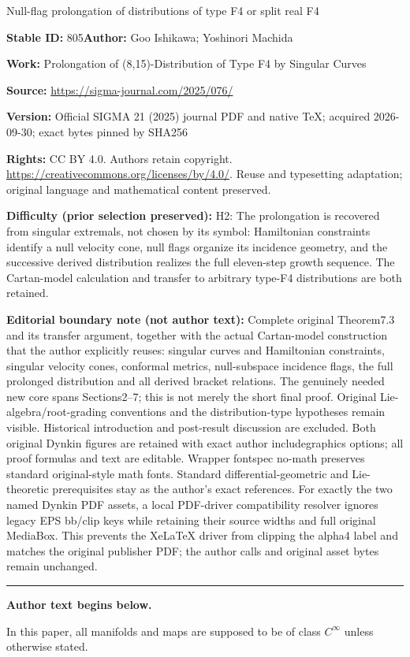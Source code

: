 \documentclass[11pt]{article}
\numberwithin{equation}{section}
\numberwithin{equation}{section}
\theoremstyle{definition}
\newcommand{\0}{\boldsymbol{0}}
\begin{document}
\begin{center}\Large Null-flag prolongation of distributions of type F4 or split real F4\end{center}
\noindent\textbf{Stable ID:} 805\quad\textbf{Author:} Goo Ishikawa; Yoshinori Machida\par
\noindent\textbf{Work:} Prolongation of (8,15)-Distribution of Type F4 by Singular Curves\par
\noindent\textbf{Source:} \url{https://sigma-journal.com/2025/076/}\par
\noindent\textbf{Version:} Official SIGMA 21 (2025) journal PDF and native TeX; acquired 2026-09-30; exact bytes pinned by SHA256\par
\noindent\textbf{Rights:} CC BY 4.0. Authors retain copyright. \url{https://creativecommons.org/licenses/by/4.0/}. Reuse and typesetting adaptation; original language and mathematical content preserved.\par
\noindent\textbf{Difficulty (prior selection preserved):} {\CJKfont H2: The prolongation is recovered from singular extremals, not chosen by its symbol: Hamiltonian constraints identify a null velocity cone, null flags organize its incidence geometry, and the successive derived distribution realizes the full eleven-step growth sequence. The Cartan-model calculation and transfer to arbitrary type-F4 distributions are both retained.}\par
\medskip\noindent\textbf{Editorial boundary note (not author text):} Complete original Theorem7.3 and its transfer argument, together with the actual Cartan-model construction that the author explicitly reuses: singular curves and Hamiltonian constraints, singular velocity cones, conformal metrics, null-subspace incidence flags, the full prolonged distribution and all derived bracket relations. The genuinely needed new core spans Sections2–7; this is not merely the short final proof. Original Lie-algebra/root-grading conventions and the distribution-type hypotheses remain visible. Historical introduction and post-result discussion are excluded. Both original Dynkin figures are retained with exact author includegraphics options; all proof formulas and text are editable. Wrapper fontspec no-math preserves standard original-style math fonts. Standard differential-geometric and Lie-theoretic prerequisites stay as the author’s exact references. For exactly the two named Dynkin PDF assets, a local PDF-driver compatibility resolver ignores legacy EPS bb/clip keys while retaining their source widths and full original MediaBox. This prevents the XeLaTeX driver from clipping the alpha4 label and matches the original publisher PDF; the author calls and original asset bytes remain unchanged.\par
\medskip\hrule\medskip\noindent\textbf{Author text begins below.}\par
\setcounter{section}{1}
In this paper, all manifolds and maps are supposed to be of class $C^\infty$ unless otherwise stated.
\end{document}
